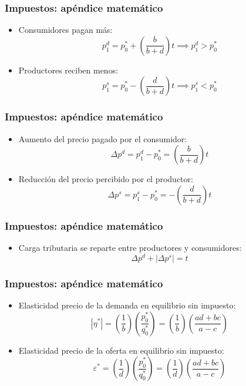 \documentclass[dvipsnames,table,leqno]{beamer}
\newcommand{\peq}[1]{{\scriptscriptstyle{#1}}}
\newcommand{\rp}[1]{\left(#1\right)}
\begin{document}
		\begin{frame}
			\frametitle{Impuestos: apéndice matemático}
			\begin{itemize}
				\item Consumidores pagan más: $$p^\peq{d}_\peq{1}=p^\peq{*}_\peq{0}+\rp{\frac{b}{b+d}}t\implies p^\peq{d}_\peq{1}>p^\peq{*}_\peq{0}$$
				\item Productores reciben menos: $$p^\peq{s}_\peq{1}=p^\peq{*}_\peq{0}-\rp{\frac{d}{b+d}}t\implies p^\peq{s}_\peq{1}<p^\peq{*}_\peq{0}$$
			\end{itemize}
		\end{frame}

		\begin{frame}
			\frametitle{Impuestos: apéndice matemático}
			\begin{itemize}
				\item Aumento del precio pagado por el consumidor: $$\Delta p^\peq{d}=p^\peq{d}_\peq{1}-p^\peq{*}_\peq{0}=\rp{\frac{b}{b+d}}t$$
				\item Reducción del precio percibido por el productor: $$\Delta p^\peq{s}=p^\peq{s}_\peq{1}-p^\peq{*}_\peq{0}=-\rp{\frac{d}{b+d}}t$$
			\end{itemize}
		\end{frame}

		\begin{frame}
			\frametitle{Impuestos: apéndice matemático}
			\begin{itemize}
				\item Carga tributaria se reparte entre productores y consumidores: $$\Delta p^\peq{d}+\left|\Delta p^\peq{s}\right|=t$$
			\end{itemize}
		\end{frame}

		\begin{frame}
			\frametitle{Impuestos: apéndice matemático}
			\begin{itemize}
				\item Elasticidad precio de la demanda en equilibrio sin impuesto: $$\left|\eta^\peq{*}\right|=\rp{\frac{1}{b}}\rp{\frac{p^\peq{*}_\peq{0}}{q^\peq{*}_\peq{0}}}=\rp{\frac{1}{b}}\rp{\frac{ad+bc}{a-c}}$$
				\item Elasticidad precio de la oferta en equilibrio sin impuesto: $$\varepsilon^\peq{*}=\rp{\frac{1}{d}}\rp{\frac{p^\peq{*}_\peq{0}}{q^\peq{*}_\peq{0}}}=\rp{\frac{1}{d}}\rp{\frac{ad+bc}{a-c}}$$
			\end{itemize}
		\end{frame}
\end{document}
